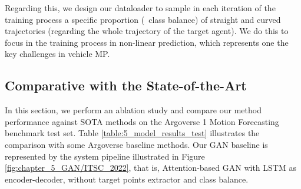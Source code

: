 Regarding this, we design our dataloader to sample in each iteration of the training process a specific proportion (\ie \ class balance) of straight and curved trajectories (regarding the whole trajectory of the target agent). We do this to focus in the training process in non-linear prediction, which represents one the key challenges in vehicle \ac{MP}. 

\subsection{Comparative with the State-of-the-Art}
\label{subsec:5_model_results}

In this section, we perform an ablation study and compare our method performance against \ac{SOTA} methods on the Argoverse 1 Motion Forecasting benchmark test set. Table \ref{table:5_model_results_test} illustrates the comparison with some Argoverse baseline methods. Our \ac{GAN} baseline is represented by the system pipeline illustrated in Figure \ref{fig:chapter_5_GAN/ITSC_2022}, that is, Attention-based \ac{GAN} with \ac{LSTM} as encoder-decoder, without target points extractor and class balance. 

